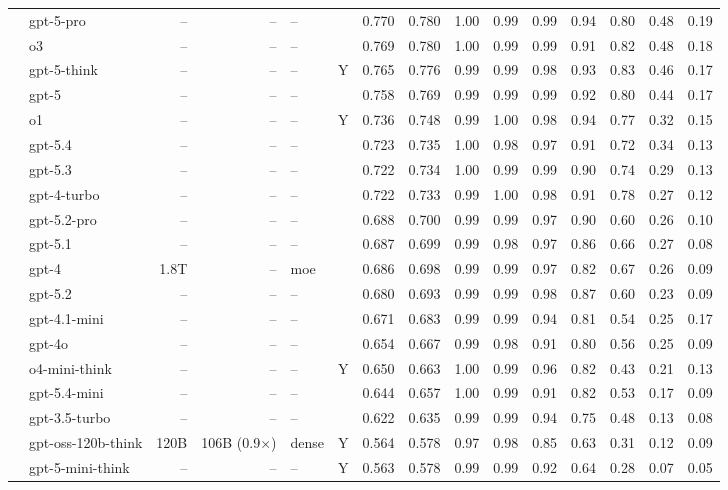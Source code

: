 \begin{longtable}{@{}ll r r l c rr rrrrrrr@{}}
 & gpt-5-pro & -- & -- & -- &  & 0.770 & 0.780 & 1.00 & 0.99 & 0.99 & 0.94 & 0.80 & 0.48 & 0.19 \\
 & o3 & -- & -- & -- &  & 0.769 & 0.780 & 1.00 & 0.99 & 0.99 & 0.91 & 0.82 & 0.48 & 0.18 \\
 & gpt-5-think & -- & -- & -- & Y & 0.765 & 0.776 & 0.99 & 0.99 & 0.98 & 0.93 & 0.83 & 0.46 & 0.17 \\
 & gpt-5 & -- & -- & -- &  & 0.758 & 0.769 & 0.99 & 0.99 & 0.99 & 0.92 & 0.80 & 0.44 & 0.17 \\
 & o1 & -- & -- & -- & Y & 0.736 & 0.748 & 0.99 & 1.00 & 0.98 & 0.94 & 0.77 & 0.32 & 0.15 \\
 & gpt-5.4 & -- & -- & -- &  & 0.723 & 0.735 & 1.00 & 0.98 & 0.97 & 0.91 & 0.72 & 0.34 & 0.13 \\
 & gpt-5.3 & -- & -- & -- &  & 0.722 & 0.734 & 1.00 & 0.99 & 0.99 & 0.90 & 0.74 & 0.29 & 0.13 \\
 & gpt-4-turbo & -- & -- & -- &  & 0.722 & 0.733 & 0.99 & 1.00 & 0.98 & 0.91 & 0.78 & 0.27 & 0.12 \\
 & gpt-5.2-pro & -- & -- & -- &  & 0.688 & 0.700 & 0.99 & 0.99 & 0.97 & 0.90 & 0.60 & 0.26 & 0.10 \\
 & gpt-5.1 & -- & -- & -- &  & 0.687 & 0.699 & 0.99 & 0.98 & 0.97 & 0.86 & 0.66 & 0.27 & 0.08 \\
 & gpt-4 & 1.8T & -- & moe &  & 0.686 & 0.698 & 0.99 & 0.99 & 0.97 & 0.82 & 0.67 & 0.26 & 0.09 \\
 & gpt-5.2 & -- & -- & -- &  & 0.680 & 0.693 & 0.99 & 0.99 & 0.98 & 0.87 & 0.60 & 0.23 & 0.09 \\
 & gpt-4.1-mini & -- & -- & -- &  & 0.671 & 0.683 & 0.99 & 0.99 & 0.94 & 0.81 & 0.54 & 0.25 & 0.17 \\
 & gpt-4o & -- & -- & -- &  & 0.654 & 0.667 & 0.99 & 0.98 & 0.91 & 0.80 & 0.56 & 0.25 & 0.09 \\
 & o4-mini-think & -- & -- & -- & Y & 0.650 & 0.663 & 1.00 & 0.99 & 0.96 & 0.82 & 0.43 & 0.21 & 0.13 \\
 & gpt-5.4-mini & -- & -- & -- &  & 0.644 & 0.657 & 1.00 & 0.99 & 0.91 & 0.82 & 0.53 & 0.17 & 0.09 \\
 & gpt-3.5-turbo & -- & -- & -- &  & 0.622 & 0.635 & 0.99 & 0.99 & 0.94 & 0.75 & 0.48 & 0.13 & 0.08 \\
 & gpt-oss-120b-think & 120B & 106B (0.9$\times$) & dense & Y & 0.564 & 0.578 & 0.97 & 0.98 & 0.85 & 0.63 & 0.31 & 0.12 & 0.09 \\
 & gpt-5-mini-think & -- & -- & -- & Y & 0.563 & 0.578 & 0.99 & 0.99 & 0.92 & 0.64 & 0.28 & 0.07 & 0.05 \\

\end{longtable}

